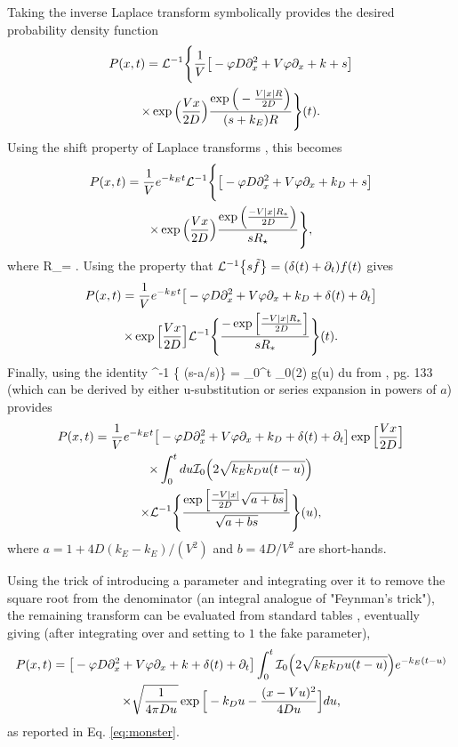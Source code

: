 Taking the inverse Laplace transform symbolically provides the desired probability density function
\begin{multline} P(x,t) = \mathcal{L}^{-1}\Bigg\{ \frac{1}{V} \big[-\varphi D\partial_x^2 + V\varphi \partial_x + k + s \big] \\ \times \exp\Big(\frac{Vx}{2D}\Big) \frac{\exp\Big(-\frac{V|x|R}{2D} \Big)}{(s+k_E)R} \Bigg\}(t). \end{multline}
Using the shift property of Laplace transforms \citep[e.g.][]{Arfken1985}, this becomes
\begin{multline} P(x,t) = \frac{1}{V}e^{-k_E t} \mathcal{L}^{-1}\Bigg\{ \big[-\varphi D\partial_x^2 + V \varphi \partial_x + k_D + s\big] \\ \times \exp\Big(\frac{Vx}{2D}\Big) \frac{\exp\Big(\frac{-V|x|R_\ast}{2D}\Big)}{s R_\star} \Bigg\},\end{multline}
where 
\be R_\ast = . \ee
Using the property that $\mathcal{L}^{-1}\big\{s \tilde{f}\big\} = (\delta(t) + \partial_t)f(t)$ \citep{Arfken1985} gives
\begin{multline}
 P(x,t) = \frac{1}{V} e^{-k_E t} \big[ -\varphi D\partial_x^2 + V\varphi \partial_x + k_D + \delta(t) + \partial_t \big] \\ \times \exp\Big[\frac{Vx}{2D}\Big] \mathcal{L}^{-1}\Bigg\{ \frac{-\exp\Big[\frac{-V|x|R_\ast}{2D}\Big]}{sR_\ast} \Bigg\}(t).
\end{multline}
Finally, using the identity
\be {}^{-1} \Big\{  (s-a/s)\Big\} = \int_0^t _0\Big(2\Big) g(u) du
\ee
from \citet{Bateman1953}, pg. 133 (which can be derived by either u-substitution or series expansion in powers of $a$) provides
\begin{multline}  P(x,t) = \frac{1}{V} e^{-k_E t}  \big[ -\varphi D\partial_x^2 + V\varphi \partial_x + k_D + \delta(t) + \partial_t \big] \exp\Big[\frac{Vx}{2D}\Big]\\ \times \int_0^t du \mathcal{I}_0\Big( 2 \sqrt{k_Ek_D u(t-u)}\Big) \\ \times \mathcal{L}^{-1}\Bigg\{ \frac{\exp\Big[ \frac{-V|x|}{2D}\sqrt{a+b s}\Big]}{\sqrt{a + b s}}\Bigg\}(u) , \label{eq:magic}\end{multline}
where $a = 1 + 4D(k_E-k_E)/(V^2)$ and $b = 4D/V^2$ are short-hands.

Using the trick of introducing a parameter and integrating over it to remove the square root from the denominator (an integral analogue of "Feynman's trick"), the remaining transform can be evaluated from standard tables \citep{Prudnikov1992a}, eventually giving (after integrating over and setting to $1$ the fake parameter),
\begin{multline} P(x,t) = \big[-\varphi D\partial_x^2 + V\varphi \partial_x + k + \delta(t)+ \partial_t \big]\int_0^t \mathcal{I}_0\Big( 2 \sqrt{k_Ek_D u(t-u)}\Big) e^{-k_E(t-u)} \\ \times \sqrt{ \frac{1}{4\pi D u}} \exp\Big[-k_D u - \frac{(x-Vu)^2}{4Du}\Big] du, \end{multline}
as reported in Eq. \ref{eq:monster}.


